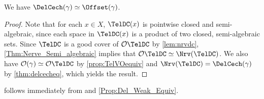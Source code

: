 %
\begin{proposition}\label{Prop:Del_Cech_Equivalence}
We have $\DelCech(\gamma)\simeq \Offset(\gamma)$.
\end{proposition}
%
\begin{proof}
Note that for each $x\in X$, $\TelDC(x)$ is pointwise closed and semi-algebraic, since each space in $\TelDC(x)$ is a product of two closed, semi-algebraic sets. Since $\TelDC$ is a good cover of $\mathcal O\TelDC$  by \cref{lem:nrvdc}, \cref{Thm:Nerve_Semi_algebraic} implies that $\mathcal O\TelDC\simeq  \Nrv(\TelDC)$.  We also have $\mathcal O(\gamma) \simeq \mathcal O\TelDC$ by \cref{prop:TelVOequiv} and $\Nrv(\TelDC)= \DelCech(\gamma)$ by \cref{thm:delcecheq}, which yields the result.  
\end{proof}
%
%
 follows immediately from  and \cref{Prop:Del_Weak_Equiv}.  
%
%
%
%
